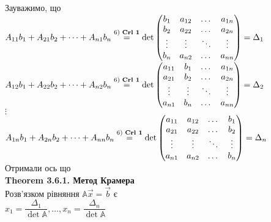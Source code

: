 \documentclass[a4paper, 14pt]{extarticle}
\def\th#1{\textbf{Theorem {#1}}}
\begin{document}
Зауважимо, що\\
$A_{11}b_1 + A_{21}b_2 + \dots + A_{n1}b_n \overset{\textrm{6) \textbf{Crl 1}}}{=} \det \begin{pmatrix}
b_1  & a_{12} & \dots & a_{1n} \\
b_2 & a_{22} & \dots & a_{2n} \\
\vdots & \vdots & \ddots & \vdots \\
b_n & a_{n2} & \dots & a_{nn}
\end{pmatrix} = \Delta_1$\\
$A_{12}b_1 + A_{22}b_2 + \dots + A_{n2}b_n \overset{\textrm{6) \textbf{Crl 1}}}{=} \det \begin{pmatrix}
a_{11}  & b_1 & \dots & a_{1n} \\
a_{21} & b_2 & \dots & a_{2n} \\
\vdots & \vdots & \ddots & \vdots \\
a_{n1} & b_n & \dots & a_{nn}
\end{pmatrix} = \Delta_2$\\
$\vdots$\\
$A_{1n}b_1 + A_{2n}b_2 + \dots + A_{nn}b_n \overset{\textrm{6) \textbf{Crl 1}}}{=} \det \begin{pmatrix}
a_{11}  & a_{12} & \dots & b_1 \\
a_{21} & a_{22} & \dots & b_2 \\
\vdots & \vdots & \ddots & \vdots \\
a_{n1} & a_{n2} & \dots & b_n
\end{pmatrix} = \Delta_n$\\
Отримали ось що\\
\th{3.6.1. Метод Крамера}\\
Розв'язком рівняння $\mathbb{A} \vec{x} = \vec{b}$ є\\
$x_1 = \dfrac{\Delta_1}{\det \mathbb{A}}, \dots, x_n = \dfrac{\Delta_n}{\det \mathbb{A}}$
\end{document}
